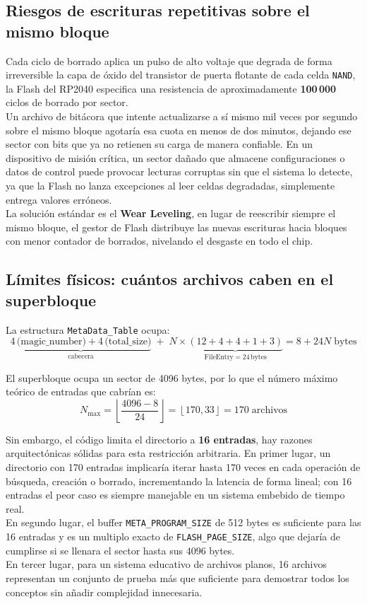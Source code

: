 \documentclass[12pt,letterpaper]{article}
\begin{document}
\subsection*{Riesgos de escrituras repetitivas sobre el mismo bloque}
Cada ciclo de borrado aplica un pulso de alto voltaje que degrada de forma irreversible la capa de óxido del
transistor de puerta flotante de cada celda \texttt{NAND}, la Flash del RP2040 especifica una resistencia de
aproximadamente \textbf{100\,000} ciclos de borrado por sector.\\
Un archivo de bitácora que intente actualizarse a sí mismo mil veces por segundo sobre el mismo bloque agotaría
esa cuota en menos de dos minutos, dejando ese sector con bits que ya no retienen su carga de manera confiable.
En un dispositivo de misión crítica, un sector dañado que almacene configuraciones o datos de control puede
provocar lecturas corruptas sin que el sistema lo detecte, ya que la Flash no lanza excepciones al leer celdas
degradadas, simplemente entrega valores erróneos.\\
La solución estándar es el \textbf{Wear Leveling}, en lugar de reescribir siempre el mismo bloque, el gestor de
Flash distribuye las nuevas escrituras hacia bloques con menor contador de borrados, nivelando el desgaste en
todo el chip.

\subsection*{Límites físicos: cuántos archivos caben en el superbloque}
La estructura \texttt{MetaData\_Table} ocupa:
\[
\underbrace{4\,\text{(magic\_number)} + 4\,\text{(total\_size)}}_{\text{cabecera}} \;+\;
N \times \underbrace{(12 + 4 + 4 + 1 + 3)}_{\text{FileEntry}=24\,\text{bytes}}
= 8 + 24N \;\text{bytes}
\]

El superbloque ocupa un sector de 4096 bytes, por lo que el número máximo teórico de entradas que cabrían es:
\[
N_{\max} = \left\lfloor \frac{4096 - 8}{24} \right\rfloor = \left\lfloor 170{,}33 \right\rfloor = 170 \;\text{archivos}
\]

Sin embargo, el código limita el directorio a \textbf{16 entradas}, hay razones arquitectónicas sólidas para esta
restricción arbitraria. En primer lugar, un directorio con 170 entradas implicaría iterar hasta 170 veces en cada
operación de búsqueda, creación o borrado, incrementando la latencia de forma lineal; con 16 entradas el peor
caso es siempre manejable en un sistema embebido de tiempo real.\\
En segundo lugar, el buffer \texttt{META\_PROGRAM\_SIZE} de 512 bytes es suficiente para las 16 entradas y es un
multiplo exacto de \texttt{FLASH\_PAGE\_SIZE}, algo que dejaría de cumplirse si se llenara el sector hasta sus
4096 bytes.\\
En tercer lugar, para un sistema educativo de archivos planos, 16 archivos representan un conjunto de prueba más
que suficiente para demostrar todos los conceptos sin añadir complejidad innecesaria.
\end{document}
